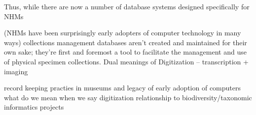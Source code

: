 Thus, while there are now a number of database systems designed specifically for NHMs

(NHMs have been surprisingly early adopters of computer technology in many ways)
collections management databases aren’t created and maintained for their own sake; they’re first and foremost a tool to facilitate the management and use of physical specimen collections. 
Dual meanings of Digitization – transcription + imaging


record keeping practies in museums and legacy of early adoption of computers
what do we mean when we say digitization
relationship to biodiversity/taxonomic informatics projects


